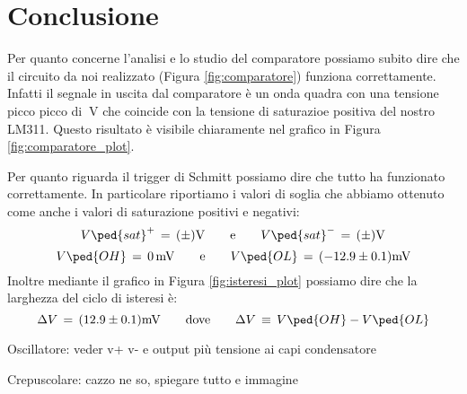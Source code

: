 \section*{Conclusione}

Per quanto concerne l'analisi e lo studio del comparatore possiamo subito dire che il circuito da noi realizzato (Figura \ref{fig:comparatore}) funziona correttamente. Infatti il segnale in uscita dal comparatore è un onda quadra con una tensione picco picco di $\SI{}{\volt}$ che coincide con la tensione di saturazioe positiva del nostro LM311. Questo risultato è visibile chiaramente nel grafico in Figura \ref{fig:comparatore_plot}.

Per quanto riguarda il trigger di Schmitt possiamo dire che tutto ha funzionato correttamente. In particolare riportiamo i valori di soglia che abbiamo ottenuto come anche i valori di saturazione positivi e negativi:
\begin{equation}
        V\ped{sat}^+\,=\,(\pm)\SI{}{\volt} \qquad \text{e} \qquad V\ped{sat}^-\,=\,(\pm)\SI{}{\volt}
\end{equation}
\begin{equation}
        V\ped{OH}\,=\,\SI{0}{\milli\volt} \qquad \text{e} \qquad V\ped{OL}\,=\,(-12.9\pm0.1)\SI{}{\milli\volt}
\end{equation}
Inoltre mediante il grafico in Figura \ref{fig:isteresi_plot} possiamo dire che la larghezza del ciclo di isteresi è:
\begin{equation}
        \Delta V \,=\,(12.9\pm0.1)\SI{}{\milli\volt} \qquad \text{dove} \qquad \Delta V \,\equiv\, V\ped{OH} - V\ped{OL} 
\end{equation}

Oscillatore: veder v+ v- e output più tensione ai capi condensatore

Crepuscolare: cazzo ne so, spiegare tutto e immagine
